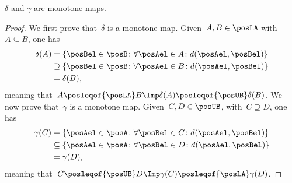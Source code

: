 \begin{lemma}
	\label{lem:deltagammamonotone}
	$\delta$ and $\gamma$ are monotone maps.
\end{lemma}
\begin{proof}
	We first prove that~$\delta$ is a monotone map.
	Given~$A,B\in \posLA$ with~$A\subseteq B$, one has
	\begin{equation}
		\begin{aligned}
			\delta(A) & =\{\posBel\in \posB\colon \forall \posAel \in A\colon d(\posAel,\posBel)\}          \\
			          & \supseteq \{\posBel\in \posB\colon \forall \posAel\in B \colon d(\posAel,\posBel)\} \\
			          & =\delta(B),
		\end{aligned}
	\end{equation}
	meaning that~$A\posleqof{\posLA} B \Imp \delta(A)\posleqof{\posUB} \delta(B)$.
	We now prove that~$\gamma$ is a monotone map.
	Given~$C,D\in \posUB$, with~$C\supseteq D$, one has
	\begin{equation}
		\begin{aligned}
			\gamma(C) & =\{\posAel\in \posA\colon \forall \posBel \in C\colon d(\posAel,\posBel)\}           \\
			          & \subseteq \{\posAel\in \posA\colon \forall \posBel \in D \colon d(\posAel,\posBel)\} \\
			          & =\gamma(D),
		\end{aligned}
	\end{equation}
	meaning that~$C\posleqof{\posUB} D \Imp \gamma(C)\posleqof{\posLA} \gamma(D)$.
\end{proof}

